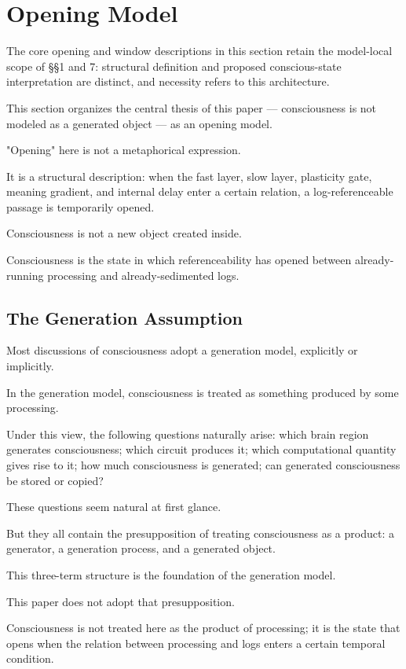 \section{Opening Model}

The core opening and window descriptions in this section retain the model-local scope of §§1 and 7: structural definition and proposed conscious-state interpretation are distinct, and necessity refers to this architecture.


This section organizes the central thesis of this paper — consciousness is not modeled as a generated object — as an opening model.

"Opening" here is not a metaphorical expression.

It is a structural description: when the fast layer, slow layer, plasticity gate, meaning gradient, and internal delay enter a certain relation, a log-referenceable passage is temporarily opened.

Consciousness is not a new object created inside.

Consciousness is the state in which referenceability has opened between already-running processing and already-sedimented logs.

\subsection{The Generation Assumption}


Most discussions of consciousness adopt a generation model, explicitly or implicitly.

In the generation model, consciousness is treated as something produced by some processing.

Under this view, the following questions naturally arise: which brain region generates consciousness; which circuit produces it; which computational quantity gives rise to it; how much consciousness is generated; can generated consciousness be stored or copied?

These questions seem natural at first glance.

But they all contain the presupposition of treating consciousness as a product: a generator, a generation process, and a generated object.

This three-term structure is the foundation of the generation model.

This paper does not adopt that presupposition.

Consciousness is not treated here as the product of processing; it is the state that opens when the relation between processing and logs enters a certain temporal condition.

